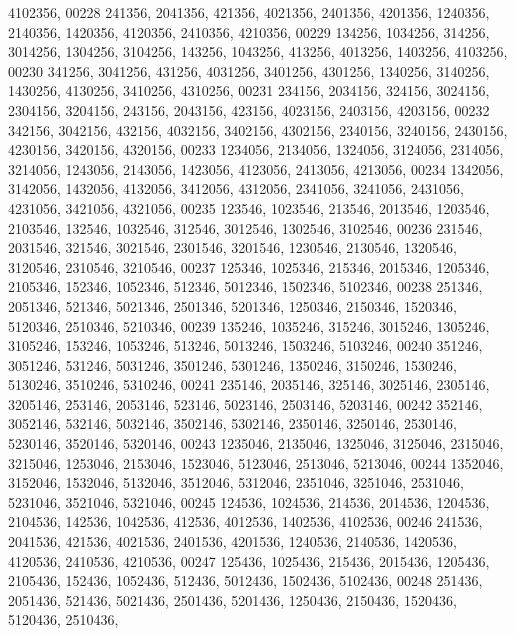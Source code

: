 \begin{DoxyCode}
      4102356,
00228        241356, 2041356,  421356, 4021356, 2401356, 4201356, 1240356, 2140356, 1420356, 4120356, 2410356, 
      4210356,
00229        134256, 1034256,  314256, 3014256, 1304256, 3104256,  143256, 1043256,  413256, 4013256, 1403256, 
      4103256,
00230        341256, 3041256,  431256, 4031256, 3401256, 4301256, 1340256, 3140256, 1430256, 4130256, 3410256, 
      4310256,
00231        234156, 2034156,  324156, 3024156, 2304156, 3204156,  243156, 2043156,  423156, 4023156, 2403156, 
      4203156,
00232        342156, 3042156,  432156, 4032156, 3402156, 4302156, 2340156, 3240156, 2430156, 4230156, 3420156, 
      4320156,
00233       1234056, 2134056, 1324056, 3124056, 2314056, 3214056, 1243056, 2143056, 1423056, 4123056, 2413056, 
      4213056,
00234       1342056, 3142056, 1432056, 4132056, 3412056, 4312056, 2341056, 3241056, 2431056, 4231056, 3421056, 
      4321056,
00235        123546, 1023546,  213546, 2013546, 1203546, 2103546,  132546, 1032546,  312546, 3012546, 1302546, 
      3102546,
00236        231546, 2031546,  321546, 3021546, 2301546, 3201546, 1230546, 2130546, 1320546, 3120546, 2310546, 
      3210546,
00237        125346, 1025346,  215346, 2015346, 1205346, 2105346,  152346, 1052346,  512346, 5012346, 1502346, 
      5102346,
00238        251346, 2051346,  521346, 5021346, 2501346, 5201346, 1250346, 2150346, 1520346, 5120346, 2510346, 
      5210346,
00239        135246, 1035246,  315246, 3015246, 1305246, 3105246,  153246, 1053246,  513246, 5013246, 1503246, 
      5103246,
00240        351246, 3051246,  531246, 5031246, 3501246, 5301246, 1350246, 3150246, 1530246, 5130246, 3510246, 
      5310246,
00241        235146, 2035146,  325146, 3025146, 2305146, 3205146,  253146, 2053146,  523146, 5023146, 2503146, 
      5203146,
00242        352146, 3052146,  532146, 5032146, 3502146, 5302146, 2350146, 3250146, 2530146, 5230146, 3520146, 
      5320146,
00243       1235046, 2135046, 1325046, 3125046, 2315046, 3215046, 1253046, 2153046, 1523046, 5123046, 2513046, 
      5213046,
00244       1352046, 3152046, 1532046, 5132046, 3512046, 5312046, 2351046, 3251046, 2531046, 5231046, 3521046, 
      5321046,
00245        124536, 1024536,  214536, 2014536, 1204536, 2104536,  142536, 1042536,  412536, 4012536, 1402536, 
      4102536,
00246        241536, 2041536,  421536, 4021536, 2401536, 4201536, 1240536, 2140536, 1420536, 4120536, 2410536, 
      4210536,
00247        125436, 1025436,  215436, 2015436, 1205436, 2105436,  152436, 1052436,  512436, 5012436, 1502436, 
      5102436,
00248        251436, 2051436,  521436, 5021436, 2501436, 5201436, 1250436, 2150436, 1520436, 5120436, 2510436, 

\end{DoxyCode}
